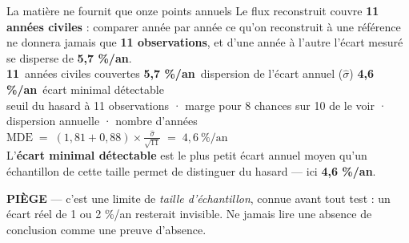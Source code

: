 \documentclass[11pt,aspectratio=169]{beamer}
\newcommand{\kpi}[3]{{\large\textbf{\textcolor{#1}{#2}}}~{\footnotesize #3}}
\newcommand{\piege}[1]{%
  \colorbox{warnorange!12}{\parbox{\dimexpr\linewidth-8pt}{\scriptsize
    \textbf{\textcolor{warnorange}{PIÈGE}}\; --- #1}}}
\newcommand{\bmaths}[2]{%
  {\scriptsize\color{black!55}#1}\\[0.2mm]
  {\small$\displaystyle #2$}\\[2mm]}
\begin{document}
\begin{frame}{La matière ne fournit que onze points annuels}
  \centering
  {\footnotesize Le flux reconstruit couvre \textbf{11 années civiles} : comparer année par année
  ce qu'on reconstruit à une référence ne donnera jamais que \textbf{11 observations}, et d'une
  année à l'autre l'écart mesuré se disperse de \textbf{5,7 \%/an}.}\\[3mm]
  \kpi{helec}{11}{années civiles couvertes}\quad
  \kpi{dataC}{5,7 \%/an}{dispersion de l'écart annuel ($\hat\sigma$)}\quad
  \kpi{alertred}{4,6 \%/an}{écart minimal détectable}\\[3mm]
  \bmaths{seuil du hasard à 11 observations · marge pour 8 chances sur 10 de le voir · dispersion annuelle · nombre d'années}
         {\mathrm{MDE} \;=\; (1{,}81 + 0{,}88)\times \frac{\hat\sigma}{\sqrt{11}} \;=\; 4{,}6\ \%/\text{an}}
  {\footnotesize L'\textbf{écart minimal détectable} est le plus petit écart annuel moyen qu'un
  échantillon de cette taille permet de distinguer du hasard --- ici \textbf{4,6 \%/an}.}\\[2.5mm]
  \piege{c'est une limite de \emph{taille d'échantillon}, connue avant tout test : un écart réel
  de 1 ou 2 \%/an resterait invisible. Ne jamais lire une absence de conclusion comme une preuve
  d'absence.}
\end{frame}
\end{document}
